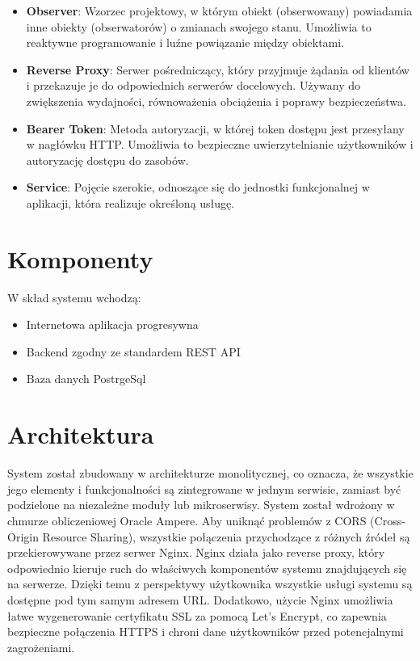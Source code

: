 \begin{itemize}
    \item \textbf{Observer}: Wzorzec projektowy, w którym obiekt (obserwowany) powiadamia inne obiekty (obserwatorów) o zmianach swojego stanu.
    Umożliwia to reaktywne programowanie i luźne powiązanie między obiektami.

    \item \textbf{Reverse Proxy}: Serwer pośredniczący, który przyjmuje żądania od klientów i przekazuje je do odpowiednich serwerów docelowych.
    Używany do zwiększenia wydajności, równoważenia obciążenia i poprawy bezpieczeństwa.

    \item \textbf{Bearer Token}: Metoda autoryzacji, w której token dostępu jest przesyłany w nagłówku HTTP\@.
    Umożliwia to bezpieczne uwierzytelnianie użytkowników i autoryzację dostępu do zasobów.

    \item \textbf{Service}: Pojęcie szerokie, odnoszące się do jednostki funkcjonalnej w aplikacji, która realizuje określoną usługę.

\end{itemize}

\section{Komponenty}\label{sec:komponenty}
W skład systemu wchodzą:
\begin{itemize}
    \item Internetowa aplikacja progresywna
    \item Backend zgodny ze standardem REST API
    \item Baza danych PostrgeSql
\end{itemize}

\section{Architektura}\label{sec:architektura}
System został zbudowany w architekturze monolitycznej, co oznacza, że wszystkie jego elementy i funkcjonalności są zintegrowane w jednym serwisie, zamiast być podzielone na niezależne moduły lub mikroserwisy.
System został wdrożony w chmurze obliczeniowej Oracle Ampere.
Aby uniknąć problemów z CORS (Cross-Origin Resource Sharing), wszystkie połączenia przychodzące z różnych źródeł są przekierowywane przez serwer Nginx.
Nginx działa jako reverse proxy, który odpowiednio kieruje ruch do właściwych komponentów systemu znajdujących się na serwerze.
Dzięki temu z perspektywy użytkownika wszystkie usługi systemu są dostępne pod tym samym adresem URL\@.
Dodatkowo, użycie Nginx umożliwia łatwe wygenerowanie certyfikatu SSL za pomocą Let's Encrypt, co zapewnia bezpieczne połączenia HTTPS i chroni dane użytkowników przed potencjalnymi zagrożeniami.

